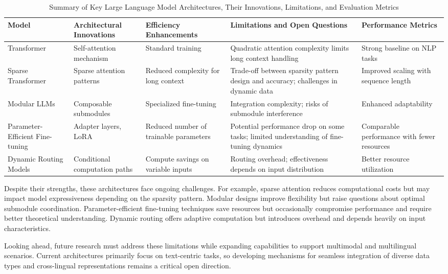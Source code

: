 \documentclass[sigconf]{acmart}
\begin{document}
\begin{table*}[htbp]
\centering
\caption{Summary of Key Large Language Model Architectures, Their Innovations, Limitations, and Evaluation Metrics}
\label{tab:architectures-summary}
\begin{adjustbox}{max width=\textwidth}
\begin{tabular}{@{}lllll@{}}
\toprule
Model & Architectural Innovations & Efficiency Enhancements & Limitations and Open Questions & Performance Metrics \\ \midrule
Transformer & Self-attention mechanism & Standard training & Quadratic attention complexity limits long context handling & Strong baseline on NLP tasks \\
Sparse Transformer & Sparse attention patterns & Reduced complexity for long context & Trade-off between sparsity pattern design and accuracy; challenges in dynamic data & Improved scaling with sequence length \\
Modular LLMs & Composable submodules & Specialized fine-tuning & Integration complexity; risks of submodule interference & Enhanced adaptability \\
Parameter-Efficient Fine-tuning & Adapter layers, LoRA & Reduced number of trainable parameters & Potential performance drop on some tasks; limited understanding of fine-tuning dynamics & Comparable performance with fewer resources \\
Dynamic Routing Models & Conditional computation paths & Compute savings on variable inputs & Routing overhead; effectiveness depends on input distribution & Better resource utilization \\ \bottomrule
\end{tabular}
\end{adjustbox}
\end{table*}

Despite their strengths, these architectures face ongoing challenges. For example, sparse attention reduces computational costs but may impact model expressiveness depending on the sparsity pattern. Modular designs improve flexibility but raise questions about optimal submodule coordination. Parameter-efficient fine-tuning techniques save resources but occasionally compromise performance and require better theoretical understanding. Dynamic routing offers adaptive computation but introduces overhead and depends heavily on input characteristics.

Looking ahead, future research must address these limitations while expanding capabilities to support multimodal and multilingual scenarios. Current architectures primarily focus on text-centric tasks, so developing mechanisms for seamless integration of diverse data types and cross-lingual representations remains a critical open direction.
\end{document}
